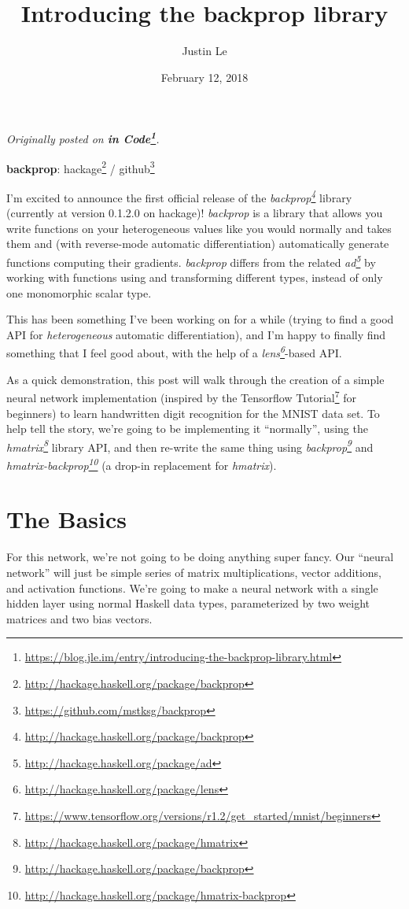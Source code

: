 \documentclass[]{article}
\title{Introducing the backprop library}
\author{Justin Le}
\date{February 12, 2018}
\renewcommand{\href}[2]{#2\footnote{\url{#1}}}
\begin{document}
\maketitle

\emph{Originally posted on
\textbf{\href{https://blog.jle.im/entry/introducing-the-backprop-library.html}{in
Code}}.}

\textbf{backprop}: \href{http://hackage.haskell.org/package/backprop}{hackage} /
\href{https://github.com/mstksg/backprop}{github}

I'm excited to announce the first official release of the
\emph{\href{http://hackage.haskell.org/package/backprop}{backprop}} library
(currently at version 0.1.2.0 on hackage)! \emph{backprop} is a library that
allows you write functions on your heterogeneous values like you would normally
and takes them and (with reverse-mode automatic differentiation) automatically
generate functions computing their gradients. \emph{backprop} differs from the
related \emph{\href{http://hackage.haskell.org/package/ad}{ad}} by working with
functions using and transforming different types, instead of only one
monomorphic scalar type.

This has been something I've been working on for a while (trying to find a good
API for \emph{heterogeneous} automatic differentiation), and I'm happy to
finally find something that I feel good about, with the help of a
\emph{\href{http://hackage.haskell.org/package/lens}{lens}}-based API.

As a quick demonstration, this post will walk through the creation of a simple
neural network implementation (inspired by the
\href{https://www.tensorflow.org/versions/r1.2/get_started/mnist/beginners}{Tensorflow
Tutorial} for beginners) to learn handwritten digit recognition for the MNIST
data set. To help tell the story, we're going to be implementing it
``normally'', using the
\emph{\href{http://hackage.haskell.org/package/hmatrix}{hmatrix}} library API,
and then re-write the same thing using
\emph{\href{http://hackage.haskell.org/package/backprop}{backprop}} and
\emph{\href{http://hackage.haskell.org/package/hmatrix-backprop}{hmatrix-backprop}}
(a drop-in replacement for \emph{hmatrix}).

\hypertarget{the-basics}{%
\section{The Basics}\label{the-basics}}

For this network, we're not going to be doing anything super fancy. Our ``neural
network'' will just be simple series of matrix multiplications, vector
additions, and activation functions. We're going to make a neural network with a
single hidden layer using normal Haskell data types, parameterized by two weight
matrices and two bias vectors.
\end{document}
